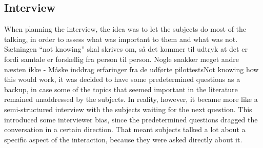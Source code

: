 \subsection{Interview}
When planning the interview, the idea was to let the subjects do most of the talking, in order to assess what was important to them and what was not. {\color{red} Sætningen ``not knowing'' skal skrives om, så det kommer til udtryk at det er fordi samtale er forskellig fra person til person. Nogle snakker meget andre næsten ikke - Måske inddrag erfaringer fra de udførte pilottests}Not knowing how this would work, it was decided to have some predetermined questions as a backup, in case some of the topics that seemed important in the literature remained unaddressed by the subjects. In reality, however, it became more like a semi-structured interview with the subjects waiting for the next question. This introduced some interviewer bias, since the predetermined questions dragged the conversation in a certain direction. That meant subjects talked a lot about a specific aspect of the interaction, because they were asked directly about it.